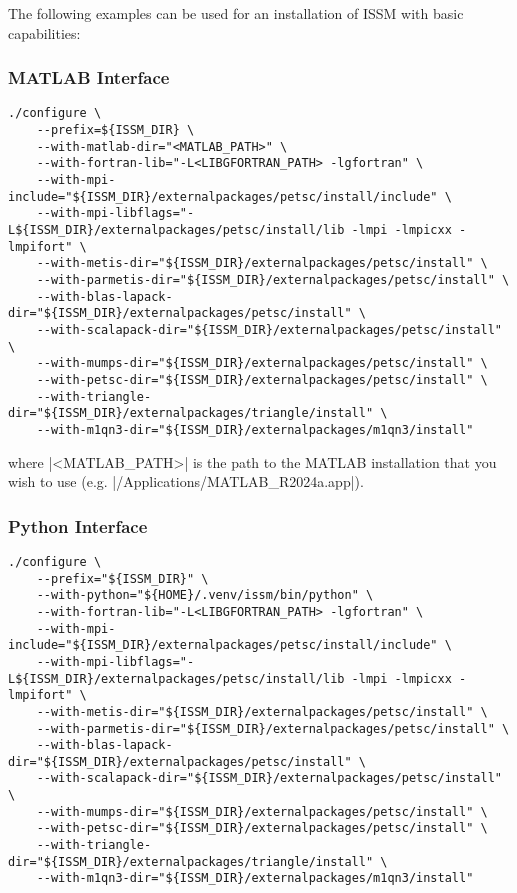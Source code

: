 The following examples can be used for an installation of ISSM with basic capabilities:

\subsubsection{MATLAB Interface}
\begin{lstlisting}
./configure \
	--prefix=${ISSM_DIR} \
	--with-matlab-dir="<MATLAB_PATH>" \
	--with-fortran-lib="-L<LIBGFORTRAN_PATH> -lgfortran" \
	--with-mpi-include="${ISSM_DIR}/externalpackages/petsc/install/include" \
	--with-mpi-libflags="-L${ISSM_DIR}/externalpackages/petsc/install/lib -lmpi -lmpicxx -lmpifort" \
	--with-metis-dir="${ISSM_DIR}/externalpackages/petsc/install" \
	--with-parmetis-dir="${ISSM_DIR}/externalpackages/petsc/install" \
	--with-blas-lapack-dir="${ISSM_DIR}/externalpackages/petsc/install" \
	--with-scalapack-dir="${ISSM_DIR}/externalpackages/petsc/install" \
	--with-mumps-dir="${ISSM_DIR}/externalpackages/petsc/install" \
	--with-petsc-dir="${ISSM_DIR}/externalpackages/petsc/install" \
	--with-triangle-dir="${ISSM_DIR}/externalpackages/triangle/install" \
	--with-m1qn3-dir="${ISSM_DIR}/externalpackages/m1qn3/install"
\end{lstlisting}
where \lstinlinebg|<MATLAB_PATH>| is the path to the MATLAB installation that you wish to use (e.g. \lstinlinebg|/Applications/MATLAB_R2024a.app|).

\subsubsection{Python Interface}
\begin{lstlisting}
./configure \
	--prefix="${ISSM_DIR}" \
	--with-python="${HOME}/.venv/issm/bin/python" \
	--with-fortran-lib="-L<LIBGFORTRAN_PATH> -lgfortran" \
	--with-mpi-include="${ISSM_DIR}/externalpackages/petsc/install/include" \
	--with-mpi-libflags="-L${ISSM_DIR}/externalpackages/petsc/install/lib -lmpi -lmpicxx -lmpifort" \
	--with-metis-dir="${ISSM_DIR}/externalpackages/petsc/install" \
	--with-parmetis-dir="${ISSM_DIR}/externalpackages/petsc/install" \
	--with-blas-lapack-dir="${ISSM_DIR}/externalpackages/petsc/install" \
	--with-scalapack-dir="${ISSM_DIR}/externalpackages/petsc/install" \
	--with-mumps-dir="${ISSM_DIR}/externalpackages/petsc/install" \
	--with-petsc-dir="${ISSM_DIR}/externalpackages/petsc/install" \
	--with-triangle-dir="${ISSM_DIR}/externalpackages/triangle/install" \
	--with-m1qn3-dir="${ISSM_DIR}/externalpackages/m1qn3/install"
\end{lstlisting}

